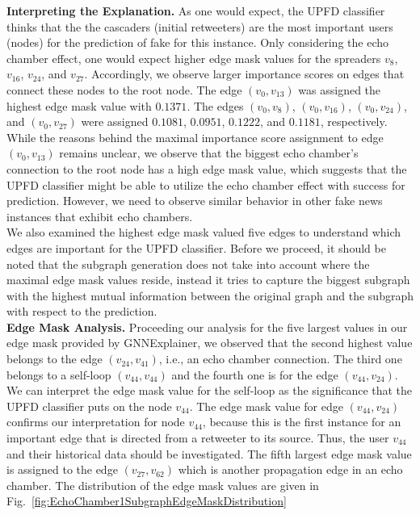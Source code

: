 \textbf{Interpreting the Explanation.} As one would expect, the UPFD classifier thinks that the the cascaders (initial retweeters) are the most important users (nodes) for the prediction of fake for this instance. Only considering the echo chamber effect, one would expect higher edge mask values for the spreaders $v_8$, $v_{16}$, $v_{24}$, and $v_{27}$. Accordingly, we observe larger importance scores on edges that connect these nodes to the root node. The edge $(v_0, v_{13})$ was assigned the highest edge mask value with $0.1371$. The edges $(v_0, v_8)$, $(v_0, v_{16})$, $(v_0, v_{24})$, and $(v_0, v_{27})$ were assigned $0.1081$, $0.0951$, $0.1222$, and $0.1181$, respectively.  While the reasons behind the maximal importance score assignment to edge $(v_0, v_{13})$ remains unclear, we observe that the biggest echo chamber's connection to the root node has a high edge mask value, which suggests that the UPFD classifier might be able to utilize the echo chamber effect with success for prediction. However, we need to observe similar behavior in other fake news instances that exhibit echo chambers.\\
We also examined the highest edge mask valued five edges to understand which edges are important for the UPFD classifier. Before we proceed, it should be noted that the subgraph generation does not take into account where the maximal edge mask values reside, instead it tries to capture the biggest subgraph with the highest mutual information between the original graph and the subgraph with respect to the prediction.\\
\textbf{Edge Mask Analysis.} Proceeding our analysis for the five largest values in our edge mask provided by GNNExplainer, we observed that the second highest value belongs to the edge $(v_{24}, v_{41})$, i.e., an echo chamber connection. The third one belongs to a self-loop $(v_{44}, v_{44})$ and the fourth one is for the edge $(v_{44}, v_{24})$. We can interpret the edge mask value for the self-loop as the significance that the UPFD classifier puts on the node $v_{44}$. The edge mask value for edge $(v_{44}, v_{24})$ confirms our interpretation for node $v_{44}$, because this is the first instance for an important edge that is directed from a retweeter to its source. Thus, the user $v_{44}$ and their historical data should be investigated. The fifth largest edge mask value is assigned to the edge $(v_{27}, v_{62})$ which is another propagation edge in an echo chamber. The distribution of the edge mask values are given in Fig.~\ref{fig:EchoChamber1SubgraphEdgeMaskDistribution}\\
